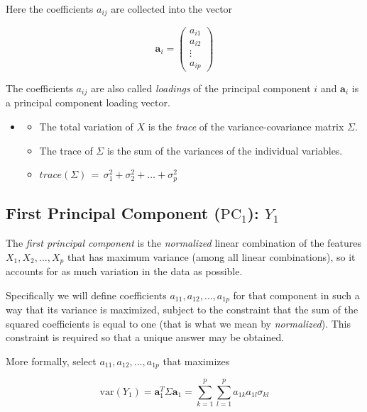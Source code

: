 \documentclass[]{book}
\providecommand{\tightlist}{%
  \setlength{\itemsep}{0pt}\setlength{\parskip}{0pt}}
\newenvironment{rmdblock}[1]
  {\begin{shaded*}
  \begin{itemize}
  \renewcommand{\labelitemi}{
    \raisebox{-.7\height}[0pt][0pt]{
      {\setkeys{Gin}{width=2em,keepaspectratio}\texttt{[image: img/icons/\#1]}}
    }
  }
  \item
  }
  {
  \end{itemize}
  \end{shaded*}
  }
\newenvironment{rmdtip}
  {\begin{rmdblock}{tip}}
  {\end{rmdblock}}
\begin{document}
Here the coefficients \(a_{ij}\) are collected into the vector

\[ \mathbf{a}_i = \left(\begin{array}{c} a_{i1}\\ a_{i2}\\ \vdots \\ a_{ip}\end{array}\right) \]

The coefficients \(a_{ij}\) are also called \emph{loadings} of the
principal component \(i\) and \(\mathbf{a}_i\) is a principal component
loading vector.

\begin{rmdtip}
\begin{itemize}
\tightlist
\item
  The total variation of \(X\) is the \emph{trace} of the
  variance-covariance matrix \(\Sigma\).
\item
  The trace of \(\Sigma\) is the sum of the variances of the individual
  variables.
\item
  \(trace(\Sigma) \, = \, \sigma^2_1 + \sigma^2_2 + \dots +\sigma^2_p\)
\end{itemize}
\end{rmdtip}

\subsection*{\texorpdfstring{First Principal Component
(\(\text{PC}_1\)):
\(Y_1\)}{First Principal Component (\textbackslash{}text\{PC\}\_1): Y\_1}}\label{first-principal-component-textpc_1-y_1}

The \emph{first principal component} is the \emph{normalized} linear
combination of the features \(X_1,X_2,\ldots,X_p\) that has maximum
variance (among all linear combinations), so it accounts for as much
variation in the data as possible.

Specifically we will define coefficients \(a_{11},a_{12},\ldots,a_{1p}\)
for that component in such a way that its variance is maximized, subject
to the constraint that the sum of the squared coefficients is equal to
one (that is what we mean by \emph{normalized}). This constraint is
required so that a unique answer may be obtained.

More formally, select \(a_{11},a_{12},\ldots,a_{1p}\) that maximizes

\[ \text{var}(Y_1) = \mathbf{a}^T_1\Sigma\mathbf{a}_1  = \sum_{k=1}^{p}\sum_{l=1}^{p}a_{1k}a_{1l}\sigma_{kl} \]
\end{document}
